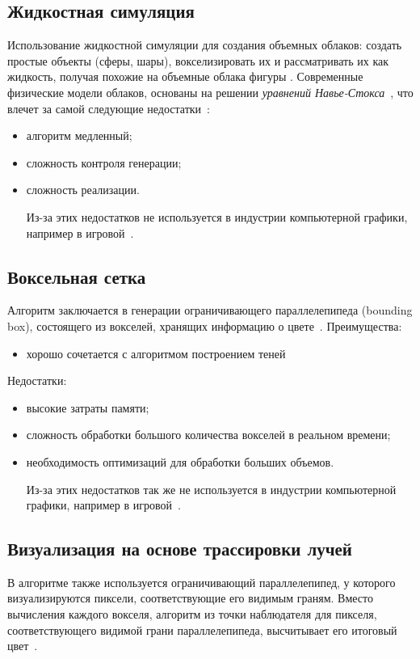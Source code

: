 \subsection{Жидкостная симуляция} 

Использование жидкостной симуляции для создания объемных облаков: создать простые объекты (сферы, шары), вокселизировать их и рассматривать их как жидкость, получая похожие на объемные облака фигуры \cite{guerrilla_volumetric_cloudscapes_2023}.
Современные физические модели облаков, основаны на решении \textit{уравнений Навье-Стокса}~\cite{sym10040125}, что влечет за самой следующие недостатки~\cite{sym10040125}:
\begin{itemize}
	\item алгоритм медленный;
	\item сложность контроля генерации;
	\item сложность реализации.
	
Из-за этих недостатков не используется в индустрии компьютерной графики, например в игровой~\cite{unigine_volumetric_clouds_2022}.
\end{itemize}
\subsection{Воксельная сетка}
Алгоритм заключается в генерации ограничивающего параллелепипеда (bounding box), состоящего из вокселей, хранящих информацию о цвете~\cite{guerrilla_volumetric_cloudscapes_2023}.
Преимущества:
\begin{itemize} 
	\item хорошо сочетается с алгоритмом построением теней
\end{itemize}
Недостатки: 
\begin{itemize} 
	\item высокие затраты памяти; 
	\item сложность обработки большого количества вокселей в реальном времени; 
	\item необходимость оптимизаций для обработки больших объемов. 
	
Из-за этих недостатков так же не используется в индустрии компьютерной графики, например в игровой~\cite{unigine_volumetric_clouds_2022}.
\end{itemize}
\subsection{Визуализация на основе трассировки лучей}
В алгоритме также используется ограничивающий параллелепипед, у которого визуализируются пиксели, соответствующие его видимым граням.
Вместо вычисления каждого вокселя, алгоритм из точки наблюдателя для пикселя, соответствующего видимой грани параллелепипеда, высчитывает его итоговый цвет~\cite{Patapom2013, sym10040125}. 

